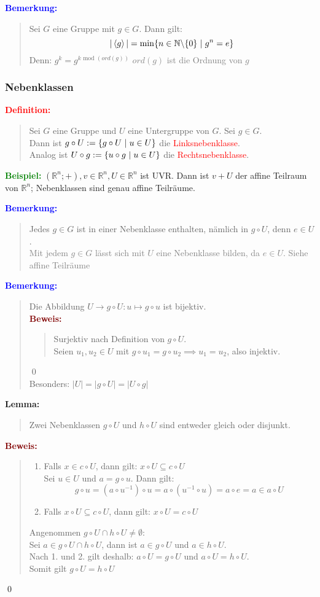 \documentclass{article}
\newcommand{\smsp}{\phantom{\hspace{3px}}}
\newcommand{\red}[1]{\textcolor{red}{#1}}
\newcommand{\gray}[1]{\textcolor{gray}{#1}}
\newcommand{\blue}[1]{\textcolor{blue}{#1}}
\newcommand{\green}[1]{\textcolor{green}{#1}}
\newcommand{\dgr}[1]{\textcolor{dgr}{#1}}
\newcommand{\maroon}[1]{\textcolor{maroon}{#1}}
\newcommand{\ex}{\green{\textbf{Beispiel: }}}
\newcommand{\de}[1]{\red{\textbf{Definition: }}\begin{quote}#1\end{quote}}
\newcommand{\an}[1]{\blue{\textbf{Bemerkung: }}\begin{quote}#1\end{quote}}
\newcommand{\lem}[1]{\dgr{\textbf{Lemma: }}\begin{quote}#1\end{quote}}
\newcommand{\pr}[1]{\maroon{\textbf{Beweis: }}\begin{quote}#1\end{quote}\qed}
\newcommand{\N}{\mathbb{N}}
\newcommand{\R}{\mathbb{R}}
\renewcommand{\st}{\smsp | \smsp}
\renewcommand{\mod}{\text{ mod }}
\newcommand{\spann}[1]{\left\langle#1\right\rangle}
\newcommand{\bs}{\backslash}
\begin{document}
\an{
    Sei $G$ eine Gruppe mit $g \in G$. Dann gilt:
    \[
        |\spann{g}| = \min\{n \in \N \bs \{0\} \st g^n = e\}
    \]
    Denn: $g^k = g^{k \mod(ord(g))}$ \gray{$ord(g)$ ist die Ordnung von $g$}
}

\subsubsection{Nebenklassen}

\de{
    Sei $G$ eine Gruppe und $U$ eine Untergruppe von $G$. Sei $g \in G$.\\
    Dann ist $g \circ U := \{g \circ U \st u \in U\}$ die \red{Linksnebenklasse}.\\
    Analog ist $U \circ g := \{u \circ g \st u \in U\}$ die \red{Rechtsnebenklasse}.
}

\ex $(\R^n; +), v \in \R^n, U \in \R^n$ ist UVR. Dann ist $v + U$ der affine Teilraum von $\R^n$; Nebenklassen sind genau affine Teilräume.

\an{
    Jedes $g \in G$ ist in einer Nebenklasse enthalten, nämlich in $g \circ U$, denn $e \in U$.\\
    \gray{Mit jedem $g \in G$ lässt sich mit $U$ eine Nebenklasse bilden, da $e \in U$. Siehe affine Teilräume}
}

\an{
    Die Abbildung $U \to g \circ U: u \mapsto g \circ u$ ist bijektiv.\\
    \pr{
        Surjektiv nach Definition von $g \circ U$.\\
        Seien $u_1, u_2 \in U$ mit $g \circ u_1 = g \circ u_2 \implies u_1 = u_2$, also injektiv.
    }\\
    Besonders: $|U| = |g \circ U| = |U \circ g|$
}

\lem{
    Zwei Nebenklassen $g \circ U$ und $h \circ U$ sind entweder gleich oder disjunkt.
}

\pr{
    \begin{enumerate}
        \item Falls $x \in c \circ U$, dann gilt: $x \circ U \subseteq c \circ U$\\
        Sei $u \in U$ und $a = g \circ u$. Dann gilt:
        \[
            g \circ u = (a \circ u^{-1}) \circ u = a \circ (u^{-1} \circ u) = a \circ e = a \in a \circ U
        \]
        \item Falls $x \circ U \subseteq c \circ U$, dann gilt: $x \circ U = c \circ U$
    \end{enumerate}

    Angenommen $g \circ U \cap h \circ U \ne \emptyset$:\\
    Sei $a \in g \circ U \cap h \circ U$, dann ist $a \in g \circ U$ und $a \in h \circ U$.\\
    Nach 1. und 2. gilt deshalb: $a \circ U = g \circ U$ und $a \circ U = h \circ U$.\\
    Somit gilt $g \circ U = h \circ U$
}
\end{document}
